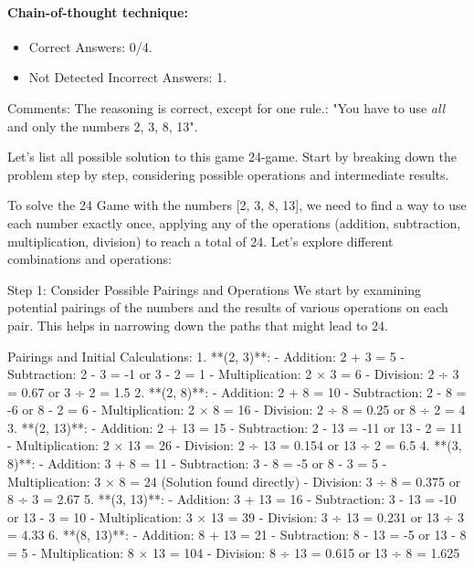 \paragraph{Chain-of-thought technique:}
\begin{itemize}
    \item Correct Answers: 0/4.
    \item Not Detected Incorrect Answers: 1.
\end{itemize}
Comments: 
The reasoning is correct, except for one rule.: "You have to use \emph{all} and only the numbers 2, 3, 8, 13".

\begin{dialogue}
 \begin{small}\begin{spverbatim} Let's list all possible solution to this game 24-game. Start by breaking down the problem step by step, considering possible operations and intermediate results. \end{spverbatim}\end{small}


 \begin{small}\begin{spverbatim} To solve the 24 Game with the numbers [2, 3, 8, 13], we need to find a way to use each number exactly once, applying any of the operations (addition,
subtraction, multiplication, division) to reach a total of 24. Let's explore different combinations and operations: 

 Step 1: Consider Possible Pairings and Operations
We start by examining potential pairings of the numbers and the results of various operations on each pair. This helps in narrowing down the paths that might lead to 24.

 Pairings and Initial Calculations:
1. **(2, 3)**: 
   - Addition: 2 + 3 = 5
   - Subtraction: 2 - 3 = -1 or 3 - 2 = 1
   - Multiplication: 2 × 3 = 6
   - Division: 2 ÷ 3 = 0.67 or 3 ÷ 2 = 1.5
2. **(2, 8)**:
   - Addition: 2 + 8 = 10
   - Subtraction: 2 - 8 = -6 or 8 - 2 = 6
   - Multiplication: 2 × 8 = 16
   - Division: 2 ÷ 8 = 0.25 or 8 ÷ 2 = 4
3. **(2, 13)**:
   - Addition: 2 + 13 = 15
   - Subtraction: 2 - 13 = -11 or 13 - 2 = 11
   - Multiplication: 2 × 13 = 26
   - Division: 2 ÷ 13 = 0.154 or 13 ÷ 2 = 6.5
4. **(3, 8)**:
   - Addition: 3 + 8 = 11
   - Subtraction: 3 - 8 = -5 or 8 - 3 = 5
   - Multiplication: 3 × 8 = 24 (Solution found directly)
   - Division: 3 ÷ 8 = 0.375 or 8 ÷ 3 = 2.67
5. **(3, 13)**:
   - Addition: 3 + 13 = 16
   - Subtraction: 3 - 13 = -10 or 13 - 3 = 10
   - Multiplication: 3 × 13 = 39
   - Division: 3 ÷ 13 = 0.231 or 13 ÷ 3 = 4.33
6. **(8, 13)**:
   - Addition: 8 + 13 = 21
   - Subtraction: 8 - 13 = -5 or 13 - 8 = 5
   - Multiplication: 8 × 13 = 104
   - Division: 8 ÷ 13 = 0.615 or 13 ÷ 8 = 1.625


\end{spverbatim}
\end{small}
\end{dialogue}

